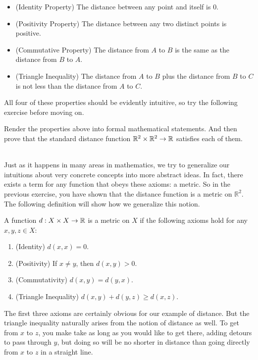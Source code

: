 \begin{itemize}
    \item (Identity Property) The distance between any point and itself is $0$.
    \item (Positivity Property) The distance between any two distinct points is positive. 
    \item (Commutative Property) The distance from $A$ to $B$ is the same as the distance from $B$ to $A$.
    \item (Triangle Inequality) The distance from $A$ to $B$ plus the distance from $B$ to $C$ is not less than the distance from $A$ to $C$.\\
\end{itemize}

All four of these properties should be evidently intuitive, so try the following exercise before moving on.\\

\begin{exercise}
    Render the properties above into formal mathematical statements. And then prove that the standard distance function $\mathbb{R}^2\times\mathbb{R}^2\to\mathbb{R}$ satisfies each of them.
\end{exercise}\\

Just as it happens in many areas in mathematics, we try to generalize our intuitions about very concrete concepts into more abstract ideas. In fact, there exists a term for any function that obeys these axioms: a metric. So in the previous exercise, you have shown that the distance function is a metric on $\mathbb{R}^2$. The following definition will show how we generalize this notion.\\

\begin{definition}[A metric on $X$]
    A function $d: X\times X \to \mathbb{R}$ is a metric on $X$ if the following axioms hold for any $x,y,z\in X$:
    \begin{enumerate}
        \item (Identity) $d(x,x)=0$. 
        \item (Positivity) If $x\neq y$, then $d(x,y)>0$. 
        \item (Commutativity) $d(x,y)=d(y,x)$. 
        \item (Triangle Inequality) $d(x,y)+d(y,z)\geq d(x,z)$. 
    \end{enumerate}
\end{definition}


The first three axioms are certainly obvious for our example of distance. But the triangle inequality naturally arises from the notion of distance as well. To get from $x$ to $z$, you make take as long as you would like to get there, adding detours to pass through $y$, but doing so will be no shorter in distance than going directly from $x$ to $z$ in a straight line. \\











